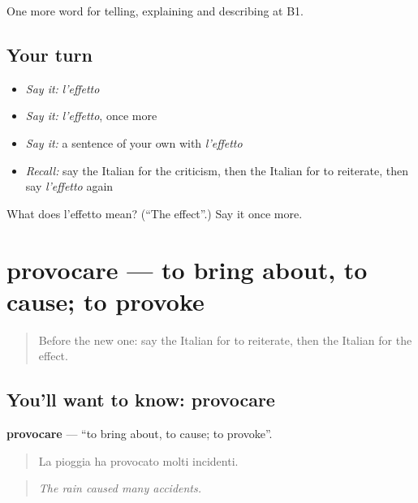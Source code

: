 \begin{grammarlens}[title={What you've built}]
One more word for telling, explaining and describing at B1.
\end{grammarlens}

\subsection*{Your turn}
\begin{itemize}
\raggedright
  \item \emph{Say it:} \emph{l'effetto}
  \item \emph{Say it:} \emph{l'effetto}, once more
  \item \emph{Say it:} a sentence of your own with \emph{l'effetto}
  \item \emph{Recall:} say the Italian for the criticism, then the Italian for to reiterate, then say \emph{l'effetto} again
\end{itemize}

\begin{tcolorbox}[breakable,colback=teal!4,colframe=teal!35!black,title={Before you move on}]
What does l'effetto mean? (\textquotedblleft{}The effect\textquotedblright{}.) Say it once more.
\end{tcolorbox}
\section[provocare]{provocare — to bring about, to cause; to provoke}

\label{lesson:IT-C349-provocare}



\begin{quote}
Before the new one: say the Italian for to reiterate, then the Italian for the effect.
\end{quote}

\subsection*{You'll want to know: provocare}
\textbf{provocare} — \textquotedblleft{}to bring about, to cause; to provoke\textquotedblright{}.

\begin{quote}
La pioggia ha provocato molti incidenti.
\end{quote}

\begin{quote}
\emph{The rain caused many accidents.}
\end{quote}

